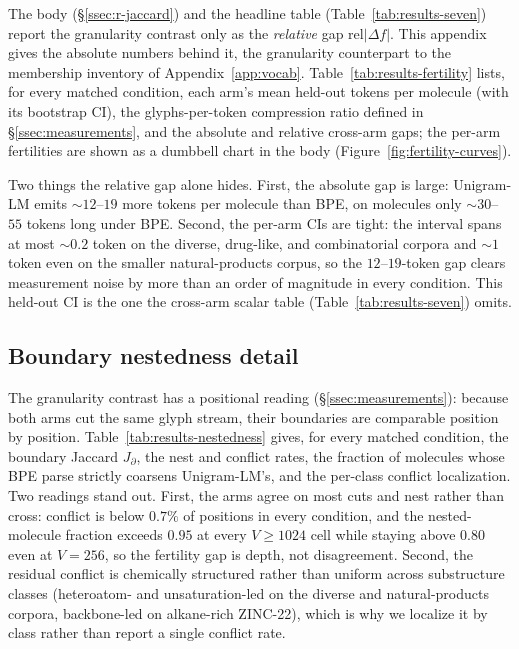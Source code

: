 \documentclass{article}
\begin{document}


The body (\S\ref{ssec:r-jaccard}) and the headline table
(Table~\ref{tab:results-seven}) report the
granularity contrast only as the \emph{relative} gap rel$|\Delta f|$. This
appendix gives the absolute numbers behind it, the granularity counterpart to
the membership inventory of Appendix~\ref{app:vocab}.
Table~\ref{tab:results-fertility} lists, for every matched condition, each arm's
mean held-out tokens per molecule (with its bootstrap CI), the glyphs-per-token
compression ratio defined in \S\ref{ssec:measurements}, and the absolute and
relative cross-arm gaps; the per-arm fertilities are shown as a dumbbell chart in
the body (Figure~\ref{fig:fertility-curves}).

Two things the relative gap alone hides. First, the absolute gap is large:
Unigram-LM emits $\sim$$12$--$19$ more tokens per molecule than BPE,
on molecules only $\sim$$30$--$55$ tokens long under BPE. Second, the
per-arm CIs are tight: the interval spans at most $\sim$$0.2$ token on the
diverse, drug-like, and combinatorial corpora and $\sim$$1$ token even on the
smaller natural-products corpus, so the $12$--$19$-token gap clears measurement
noise by more than an order of magnitude in every condition. This held-out CI is
the one the cross-arm scalar table (Table~\ref{tab:results-seven}) omits.

\subsection{Boundary nestedness detail}\label{app:nestedness}



The granularity contrast has a positional reading (\S\ref{ssec:measurements}):
because both arms cut the same glyph stream, their boundaries are comparable
position by position. Table~\ref{tab:results-nestedness} gives, for every matched
condition, the boundary Jaccard $J_{\partial}$, the nest and conflict rates, the
fraction of molecules whose BPE parse strictly coarsens Unigram-LM's, and the
per-class conflict localization. Two readings stand out. First, the arms agree on
most cuts and nest rather than cross: conflict is below $0.7\%$ of positions in
every condition, and the nested-molecule fraction exceeds $0.95$ at every
$V{\ge}1024$ cell while staying above $0.80$ even at $V{=}256$, so the fertility
gap is depth, not disagreement. Second, the residual conflict is chemically
structured rather than uniform across substructure classes (heteroatom- and
unsaturation-led on the diverse and natural-products corpora, backbone-led on
alkane-rich ZINC-22), which is why we localize it by class rather than report a
single conflict rate.
\end{document}

